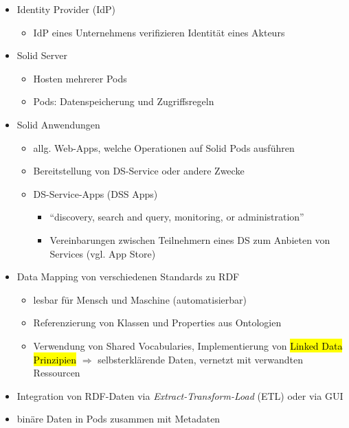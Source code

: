 \begin{itemize}
    \item Identity Provider (IdP)
    \begin{itemize}
        \item IdP eines Unternehmens verifizieren Identität eines Akteurs
    \end{itemize}
    
    \item Solid Server
    \begin{itemize}
        \item Hosten mehrerer Pods
        \item Pods: Datenspeicherung und Zugriffsregeln
    \end{itemize}
    
    \item Solid Anwendungen
    \begin{itemize}
        \item allg. Web-Apps, welche Operationen auf Solid Pods ausführen
        \item Bereitstellung von DS-Service oder andere Zwecke
        \item DS-Service-Apps (DSS Apps)
        \begin{itemize}
            \item \enquote{discovery, search and query, monitoring, or administration}~\cite{mecklerWebLinkedData2023}
            \item Vereinbarungen zwischen Teilnehmern eines DS zum Anbieten von Services (vgl. App Store)
        \end{itemize}
    \end{itemize}

    \item Data Mapping von verschiedenen Standards zu RDF
    \begin{itemize}
        \item lesbar für Mensch und Maschine (automatisierbar)
        \item Referenzierung von Klassen und Properties aus Ontologien
        \item Verwendung von Shared Vocabularies, Implementierung von \hl{Linked Data Prinzipien} $\Rightarrow$ selbsterklärende Daten, vernetzt mit verwandten Ressourcen
    \end{itemize}

    \item Integration von RDF-Daten via \emph{Extract-Transform-Load} (ETL) oder via GUI
    \item binäre Daten in Pods zusammen mit Metadaten~\cite{mecklerWebLinkedData2023}
\end{itemize}

